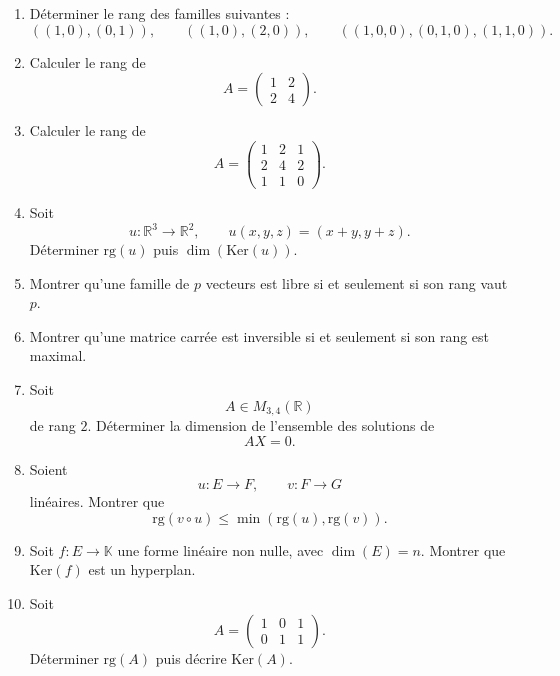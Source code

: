 \documentclass[11pt,a4paper]{article}
\theoremstyle{remark}
\newcommand{\R}{\mathbb{R}}
\newcommand{\K}{\mathbb{K}}
\newcommand{\Ker}{\mathrm{Ker}}
\newcommand{\rg}{\mathrm{rg}}
\begin{document}
\begin{enumerate}[label=\textbf{Exercice \arabic*.}]
    \item Déterminer le rang des familles suivantes :
    \[
    ((1,0),(0,1)),
    \qquad
    ((1,0),(2,0)),
    \qquad
    ((1,0,0),(0,1,0),(1,1,0)).
    \]

    \item Calculer le rang de
    \[
    A=
    \begin{pmatrix}
    1 & 2\\
    2 & 4
    \end{pmatrix}.
    \]

    \item Calculer le rang de
    \[
    A=
    \begin{pmatrix}
    1 & 2 & 1\\
    2 & 4 & 2\\
    1 & 1 & 0
    \end{pmatrix}.
    \]

    \item Soit
    \[
    u:\R^3\to\R^2,\qquad u(x,y,z)=(x+y,y+z).
    \]
    Déterminer \(\rg(u)\) puis \(\dim(\Ker(u))\).

    \item Montrer qu’une famille de \(p\) vecteurs est libre si et seulement si son rang vaut \(p\).

    \item Montrer qu’une matrice carrée est inversible si et seulement si son rang est maximal.

    \item Soit
    \[
    A\in M_{3,4}(\R)
    \]
    de rang \(2\). Déterminer la dimension de l’ensemble des solutions de
    \[
    AX=0.
    \]

    \item Soient
    \[
    u:E\to F,\qquad v:F\to G
    \]
    linéaires. Montrer que
    \[
    \rg(v\circ u)\le \min(\rg(u),\rg(v)).
    \]

    \item Soit \(f:E\to\K\) une forme linéaire non nulle, avec \(\dim(E)=n\). Montrer que \(\Ker(f)\) est un hyperplan.

    \item Soit
    \[
    A=
    \begin{pmatrix}
    1 & 0 & 1\\
    0 & 1 & 1
    \end{pmatrix}.
    \]
    Déterminer \(\rg(A)\) puis décrire \(\Ker(A)\).
\end{enumerate}
\end{document}
